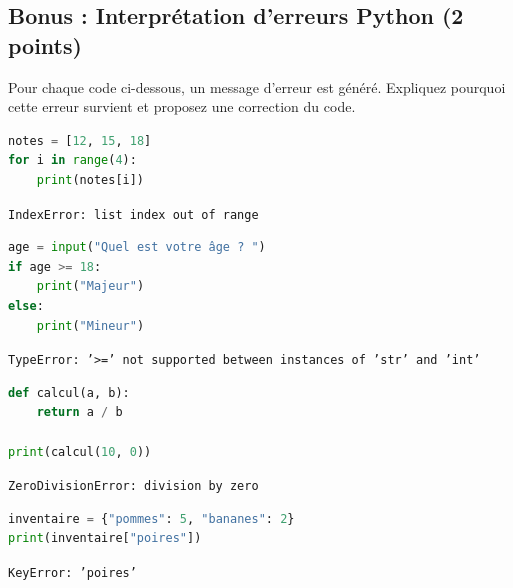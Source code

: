 \documentclass[a4paper, noanswers, addpoints, 12pt]{exam}
\begin{document}
\begin{questions}

\section{Bonus : Interprétation d'erreurs Python (2 points)}

\question[2] Pour chaque code ci-dessous, un message d'erreur est généré. Expliquez pourquoi cette erreur survient et proposez une correction du code.

\begin{lstlisting}[language=Python]
notes = [12, 15, 18]
for i in range(4):
    print(notes[i])
\end{lstlisting}
\begin{tcolorbox}[colback=red!5,colframe=red!75,title=Terminal Python, fonttitle=\bfseries]
\texttt{\color{red}IndexError: list index out of range}
\end{tcolorbox}

\begin{lstlisting}[language=Python]
age = input("Quel est votre âge ? ")
if age >= 18:
    print("Majeur")
else:
    print("Mineur")
\end{lstlisting}
\begin{tcolorbox}[colback=red!5,colframe=red!75,title=Terminal Python, fonttitle=\bfseries]
\texttt{\color{red}TypeError: '>=' not supported between instances of 'str' and 'int'}
\end{tcolorbox}

\begin{lstlisting}[language=Python]
def calcul(a, b):
    return a / b

print(calcul(10, 0))
\end{lstlisting}
\begin{tcolorbox}[colback=red!5,colframe=red!75,title=Terminal Python, fonttitle=\bfseries]
\texttt{\color{red}ZeroDivisionError: division by zero}
\end{tcolorbox}

\begin{lstlisting}[language=Python]
inventaire = {"pommes": 5, "bananes": 2}
print(inventaire["poires"])
\end{lstlisting}
\begin{tcolorbox}[colback=red!5,colframe=red!75,title=Terminal Python, fonttitle=\bfseries]
\texttt{\color{red}KeyError: 'poires'}
\end{tcolorbox}


\end{questions}
\end{document}
